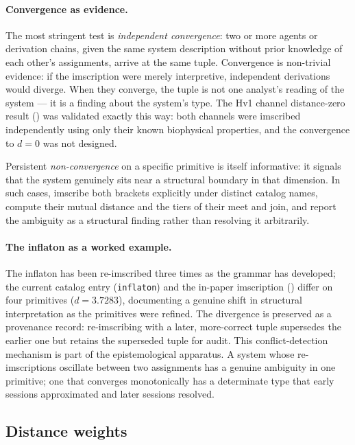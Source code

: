 \documentclass[12pt,a4paper]{article}
\makeatletter
\renewcommand{\_}{\ig@origunderscore\discretionary{}{}{}}
\makeatother
\begin{document}
\paragraph{Convergence as evidence.}
The most stringent test is \emph{independent convergence}: two or
more agents or derivation chains, given the same system description
without prior knowledge of each other's assignments, arrive at the
same tuple. Convergence is non-trivial evidence: if the imscription were
merely interpretive, independent derivations would diverge. When they
converge, the tuple is not one analyst's reading of the system --- it
is a finding about the system's type. The Hv1 channel
distance-zero result () was validated exactly this way:
both channels were imscribed independently using only their known
biophysical properties, and the convergence to $d = 0$ was not
designed.

Persistent \emph{non-convergence} on a specific primitive is itself
informative: it signals that the system genuinely sits near a
structural boundary in that dimension. In such cases, imscribe both
brackets explicitly under distinct catalog names, compute their
mutual distance and the tiers of their meet and join, and report
the ambiguity as a structural finding rather than resolving it
arbitrarily.

\paragraph{The inflaton as a worked example.}
The inflaton has been re-imscribed three times as the grammar has
developed; the current catalog entry (\texttt{inflaton}) and the
in-paper imscription () differ on four primitives
($d = 3.7283$), documenting a genuine shift in structural
interpretation as the primitives were refined. The divergence is
preserved as a provenance record: re-imscribing with a later,
more-correct tuple supersedes the earlier one but retains the
superseded tuple for audit. This conflict-detection mechanism is
part of the epistemological apparatus. A system whose re-imscriptions
oscillate between two assignments has a genuine ambiguity in one
primitive; one that converges monotonically has a determinate type
that early sessions approximated and later sessions resolved.

\subsection{Distance weights}
\end{document}
